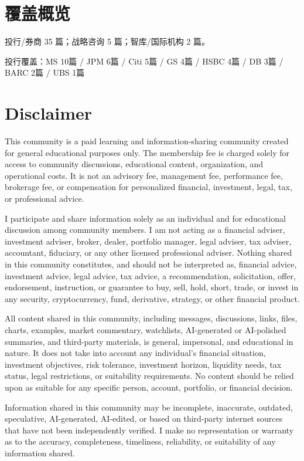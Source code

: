\documentclass[11pt]{ctexart}
\begin{document}
\section{覆盖概览}
投行/券商 35 篇；战略咨询 5 篇；智库/国际机构 2 篇。\par
投行覆盖：MS 10篇 / JPM 6篇 / Citi 5篇 / GS 4篇 / HSBC 4篇 / DB 3篇 / BARC 2篇 / UBS 1篇\par
\section{Disclaimer}
{\scriptsize\color{refgray}
This community is a paid learning and information-sharing community created for general educational purposes only. The membership fee is charged solely for access to community discussions, educational content, organization, and operational costs. It is not an advisory fee, management fee, performance fee, brokerage fee, or compensation for personalized financial, investment, legal, tax, or professional advice.\par
I participate and share information solely as an individual and for educational discussion among community members. I am not acting as a financial adviser, investment adviser, broker, dealer, portfolio manager, legal adviser, tax adviser, accountant, fiduciary, or any other licensed professional adviser. Nothing shared in this community constitutes, and should not be interpreted as, financial advice, investment advice, legal advice, tax advice, a recommendation, solicitation, offer, endorsement, instruction, or guarantee to buy, sell, hold, short, trade, or invest in any security, cryptocurrency, fund, derivative, strategy, or other financial product.\par
All content shared in this community, including messages, discussions, links, files, charts, examples, market commentary, watchlists, AI-generated or AI-polished summaries, and third-party materials, is general, impersonal, and educational in nature. It does not take into account any individual's financial situation, investment objectives, risk tolerance, investment horizon, liquidity needs, tax status, legal restrictions, or suitability requirements. No content should be relied upon as suitable for any specific person, account, portfolio, or financial decision.\par
Information shared in this community may be incomplete, inaccurate, outdated, speculative, AI-generated, AI-edited, or based on third-party internet sources that have not been independently verified. I make no representation or warranty as to the accuracy, completeness, timeliness, reliability, or suitability of any information shared.\par
}
\end{document}

